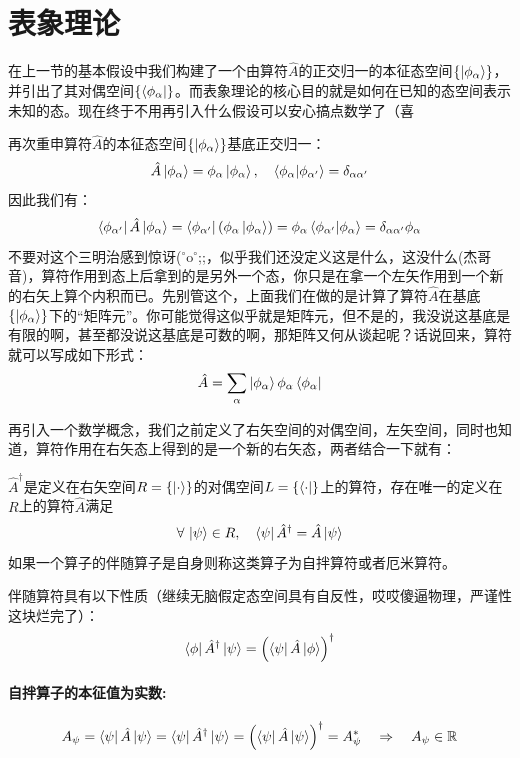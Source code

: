 \section{表象理论}
在上一节的基本假设中我们构建了一个由算符$\hat{A}$的正交归一的本征态空间$\{\ket{\phi_{\alpha}}\}$，并引出了其对偶空间$\{\bra{\phi_{\alpha}}\}$。而表象理论的核心目的就是如何在已知的态空间表示未知的态。现在终于不用再引入什么假设可以安心搞点数学了（喜

再次重申算符$\hat{A}$的本征态空间$\{\ket{\phi_{\alpha}}\}$基底正交归一：
\[\hat{A}\ket{\phi_{\alpha}}=\phi_{\alpha}\ket{\phi_{\alpha}}, \quad \bra{\phi_{\alpha}}\ket{\phi_{\alpha'}}=\delta_{\alpha\alpha'}\]
因此我们有：
\[\bra{\phi_{\alpha'}}\hat{A}\ket{\phi_{\alpha}}=\bra{\phi_{\alpha'}}\left(\phi_{\alpha}\ket{\phi_{\alpha}}\right)=\phi_{\alpha}\bra{\phi_{\alpha'}}\ket{\phi_{\alpha}}=\delta_{\alpha\alpha'}\phi_{\alpha}\]
不要对这个三明治感到惊讶($^{\circ}$o$^{\circ}$;;，似乎我们还没定义这是什么，这没什么(杰哥音)，算符作用到态上后拿到的是另外一个态，你只是在拿一个左矢作用到一个新的右矢上算个内积而已。先别管这个，上面我们在做的是计算了算符$\hat{A}$在基底$\{\ket{\phi_{\alpha}}\}$下的“矩阵元”。你可能觉得这似乎就是矩阵元，但不是的，我没说这基底是有限的啊，甚至都没说这基底是可数的啊，那矩阵又何从谈起呢？话说回来，算符就可以写成如下形式：
\[\hat{A}=\sum_{\alpha}\ket{\phi_{\alpha}}\phi_{\alpha}\bra{\phi_{\alpha}}\]

再引入一个数学概念，我们之前定义了右矢空间的对偶空间，左矢空间，同时也知道，算符作用在右矢态上得到的是一个新的右矢态，两者结合一下就有：
\begin{definition}[伴随算符]
$\hat{A}^{\dagger}$是定义在右矢空间$R=\{\ket{\cdot}\}$的对偶空间$L=\{\bra{\cdot}\}$上的算符，存在唯一的定义在$R$上的算符$\hat{A}$满足
\[\forall \, \ket{\psi} \in R, \quad \bra{\psi}\hat{A}^{\dagger}=\hat{A}\ket{\psi}\]
如果一个算子的伴随算子是自身则称这类算子为自拌算符或者厄米算符。
\end{definition}

伴随算符具有以下性质（继续无脑假定态空间具有自反性，哎哎傻逼物理，严谨性这块烂完了）：
\[\bra{\phi}\hat{A}^{\dagger}\ket{\psi}=\left(\bra{\psi}\hat{A}\ket{\phi}\right)^{\dagger}\]

\paragraph*{自拌算子的本征值为实数:}
\[A_{\psi}=\bra{\psi}\hat{A}\ket{\psi}=\bra{\psi}\hat{A}^{\dagger}\ket{\psi}=\left(\bra{\psi}\hat{A}\ket{\psi}\right)^{\dagger}=A_{\psi}^* \quad \Rightarrow \quad A_{\psi}\in\mathbb{R}\]

